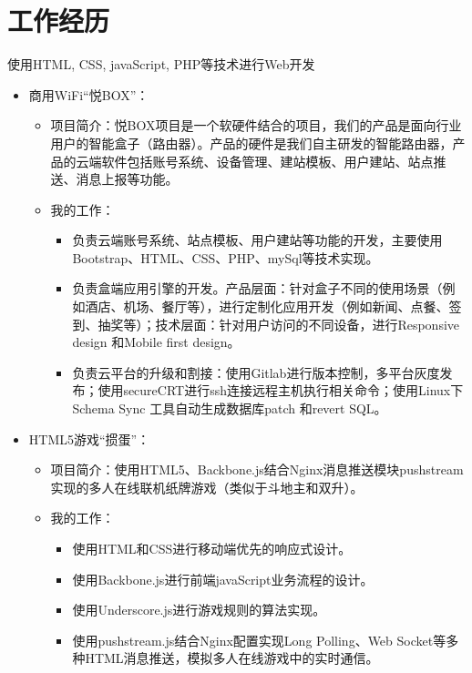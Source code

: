 \documentclass[11pt,a4paper,sans]{moderncv}        %
\begin{document}
\section{工作经历}
{使用HTML, CSS, javaScript, PHP等技术进行Web开发
\newline{}%
\begin{itemize}%
\item 商用WiFi“悦BOX”：
  \begin{itemize}%
  \item 项目简介：悦BOX项目是一个软硬件结合的项目，我们的产品是面向行业用户的智能盒子（路由器）。产品的硬件是我们自主研发的智能路由器，产品的云端软件包括账号系统、设备管理、建站模板、用户建站、站点推送、消息上报等功能。
  \item 我的工作：
      \begin{itemize}%
        \item 负责云端账号系统、站点模板、用户建站等功能的开发，主要使用Bootstrap、HTML、CSS、PHP、mySql等技术实现。
        \item 负责盒端应用引擎的开发。产品层面：针对盒子不同的使用场景（例如酒店、机场、餐厅等），进行定制化应用开发（例如新闻、点餐、签到、抽奖等）；技术层面：针对用户访问的不同设备，进行Responsive design 和Mobile first design。
        \item 负责云平台的升级和割接：使用Gitlab进行版本控制，多平台灰度发布；使用secureCRT进行ssh连接远程主机执行相关命令；使用Linux下Schema Sync 工具自动生成数据库patch 和revert SQL。
      \end{itemize}
  \end{itemize}
\item HTML5游戏“掼蛋”：
  \begin{itemize}%
  \item 项目简介：使用HTML5、Backbone.js结合Nginx消息推送模块pushstream实现的多人在线联机纸牌游戏（类似于斗地主和双升）。
  \item 我的工作：
      \begin{itemize}%
        \item 使用HTML和CSS进行移动端优先的响应式设计。
        \item 使用Backbone.js进行前端javaScript业务流程的设计。
        \item 使用Underscore.js进行游戏规则的算法实现。
        \item 使用pushstream.js结合Nginx配置实现Long Polling、Web Socket等多种HTML消息推送，模拟多人在线游戏中的实时通信。

\end{itemize}
\end{itemize}
\end{itemize}}
\end{document}
